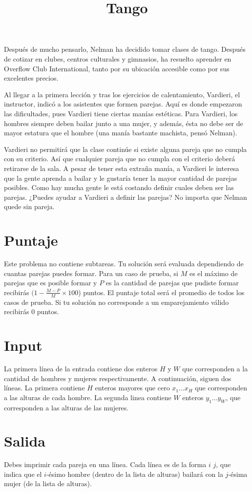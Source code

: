 \documentclass{article}
\title{Tango}
\begin{document}
\maketitle

Después de mucho pensarlo, Nelman ha decidido tomar clases de tango. Después de
cotizar en clubes, centros culturales y gimnasios, ha resuelto aprender en
Overflow Club International, tanto por su ubicación accesible como por sus
excelentes precios.

Al llegar a la primera lección y tras los ejercicios de calentamiento, Vardieri,
el instructor, indicó a los asistentes que formen parejas. Aquí es donde 
empezaron las dificultades, pues Vardieri tiene ciertas manías estéticas. Para
Vardieri, los hombres siempre deben bailar junto a una mujer, y además, ésta no
debe ser de mayor estatura que el hombre (una manía bastante machista, pensó
Nelman).

Vardieri no permitirá que la clase continúe si existe alguna pareja que no
cumpla con su criterio. Así que cualquier pareja que no cumpla con el criterio
deberá retirarse de la sala. A pesar de tener esta extraña manía, a Vardieri le
interesa que la gente aprenda a bailar y le gustaría tener la mayor cantidad
de parejas posibles. Como hay mucha gente le está costando definir cuales deben
ser las parejas. ¿Puedes ayudar a Vardieri a definir las parejas?
No importa que Nelman quede sin pareja.

\section*{Puntaje}
Este problema no contiene subtareas. Tu solución será evaluada dependiendo de
cuantas parejas puedes formar. Para un caso de prueba, si $M$ es el máximo de
parejas que es posible formar y $P$ es la cantidad de parejas que pudiste formar
recibirás $(1-\frac{M-P}{M}\times 100$) puntos. El puntaje total será el
promedio de todos los casos de prueba. Si tu solución no corresponde a un
emparejamiento válido recibirás 0 puntos.

\section*{Input}
La primera línea de la entrada contiene dos enteros $H$ y $W$ que corresponden a
la cantidad de hombres y mujeres respectivamente. A continuación, siguen dos líneas.
La primera contiene $H$ enteros mayores que cero $x_1 \dots x_H$ que corresponden
a las alturas de cada hombre. La segunda linea contiene $W$ enteros $y_1 \dots y_W$, 
que corresponden a las alturas de las mujeres.

\section*{Salida}
Debes imprimir cada pareja en una línea. Cada línea es de la forma $i$ $j$, que
indica que el $i$-ésimo hombre (dentro de la lista de alturas) bailará con la
$j$-ésima mujer (de la lista de alturas).
\end{document}
